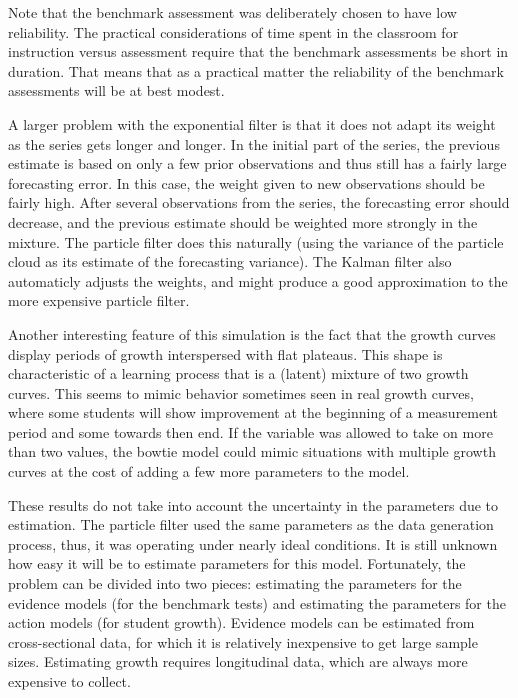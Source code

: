 \documentclass[12pt]{RR-article}
\begin{document}
Note that the benchmark assessment was deliberately chosen to have low
reliability.  The practical considerations of time spent in the
classroom for instruction versus assessment require that the benchmark
assessments be short in duration.  That means that as a practical
matter the reliability of the benchmark assessments will be at best
modest.

A larger problem with the exponential filter is that it does not adapt
its weight as the series gets longer and longer.  In the initial part
of the series, the previous estimate is based on only a few prior
observations and thus still has a fairly large forecasting error.  In
this case, the weight given to new observations should be fairly high.
After several observations from the series, the forecasting error
should decrease, and the previous estimate should be weighted more
strongly in the mixture.  The particle filter does this naturally
(using the variance of the particle cloud as its estimate of the
forecasting variance).  The Kalman filter \cite{KalmanBucy1961} also
automaticly adjusts the weights, and might produce a good
approximation to the more expensive particle filter.

\medskip

Another interesting feature of this simulation is the fact that the
growth curves display periods of growth interspersed with flat
plateaus.  This shape is characteristic of a learning process that is
a (latent) mixture of two growth curves.  This seems to mimic behavior
sometimes seen in real growth curves, where some students will show
improvement at the beginning of a measurement period and some towards
then end.  If the  variable was allowed to take on more
than two values, the bowtie model could mimic situations with multiple
growth curves at the cost of adding a few more parameters to the
model.

These results do not take into account the uncertainty in the
parameters due to estimation.  The particle filter used the same
parameters as the data generation process, thus, it was operating
under nearly ideal conditions.  It is still unknown how easy it will
be to estimate parameters for this model.  Fortunately, the problem
can be divided into two pieces:  estimating the parameters for the
evidence models (for the benchmark tests) and estimating the
parameters for the action models (for student growth).  Evidence
models can be estimated from cross-sectional data, for which it is
relatively inexpensive to get large sample sizes.  Estimating growth
requires longitudinal data, which are always more expensive to collect.
\end{document}

